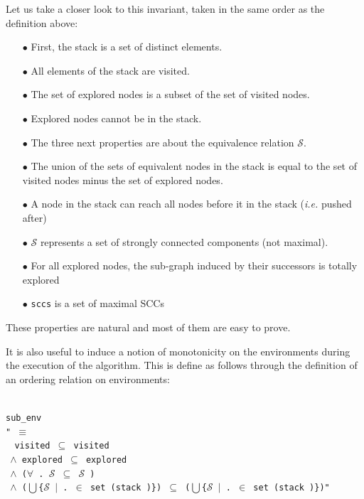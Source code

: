 \documentclass[a4 paper, 12pt]{article}
\newcommand{\where}{{\color{isa_green}{where}}}
\newcommand{\isa}[1]{\small\texttt{\\\noindent#1}}
\newcommand{\blue}[1]{{\color{isa_dark_blue}{#1}}}
\newcommand{\bblue}[1]{{\color{isa_blue}{#1}}}
\newcommand{\green}[1]{{\color{isa_dark_green}{#1}}}
\theoremstyle{definition}
\begin{document}
Let us take a closer look to this invariant, taken in the same order as the definition above:
\begin{itemize}
    \item[$\bullet$] First, the stack is a set of distinct elements.
    \item[$\bullet$] All elements of the stack are visited.
    \item[$\bullet$] The set of explored nodes is a subset of the set of visited nodes.
    \item[$\bullet$] Explored nodes cannot be in the stack.
    \item[$\bullet$] The three next properties are about the equivalence relation $\mathcal{S}$.
    \item[$\bullet$] The union of the sets of equivalent nodes in the stack is equal to the set of visited nodes minus the set of explored nodes.
    \item[$\bullet$] A node in the stack can reach all nodes before it in the stack (\textit{i.e.} pushed after)
    \item[$\bullet$] $\mathcal{S}$ represents a set of strongly connected components (not maximal).
    \item[$\bullet$] For all explored nodes, the sub-graph induced by their successors is totally explored
    \item[$\bullet$] \texttt{sccs} is a set of maximal SCCs
\end{itemize}
\noindent
These properties are natural and most of them are easy to prove.

\BlankLine
\BlankLine

It is also useful to induce a notion of monotonicity on the environments during the execution of the algorithm. This is define as follows through the definition of an ordering relation on environments:

\isa{
\bblue{definition} sub\_env \where\\
"\blue{sub\_env} \green{e e'} $\equiv$\\
$~~~~$visited \green{e} $\subseteq$ visited \green{e'}\\
$~~$$\wedge$ explored \green{e} $\subseteq$ explored \green{e'}\\
$~~$$\wedge$ ($\forall$ \green{v}. $\mathcal{S}$ \green{e v} $\subseteq$ $\mathcal{S}$ \green{e' v})\\
$~~$$\wedge$ ($\bigcup$\{$\mathcal{S}$ \green{e v} $|$ \green{v}. \green{v} $\in$ set (stack \green{e})\}) $\subseteq$ ($\bigcup$\{$\mathcal{S}$ \green{e' v} $|$ \green{v}. \green{v} $\in$ set (stack \green{e'})\})"
}
\end{document}
